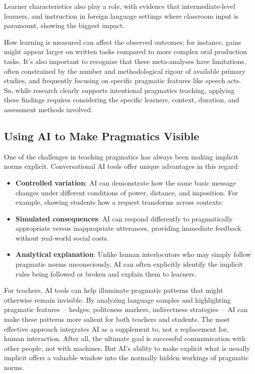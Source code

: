 Learner characteristics also play a role, with evidence that intermediate-level learners, and instruction in foreign language settings where classroom input is paramount, showing the biggest impact.

How learning is measured can affect the observed outcomes; for instance, gains might appear larger on written tasks compared to more complex oral production tasks. It's also important to recognize that these meta-analyses have limitations, often constrained by the number and methodological rigour of available primary studies, and frequently focusing on specific pragmatic features like speech acts. So, while research clearly supports intentional pragmatics teaching, applying these findings requires considering the specific learners, context, duration, and assessment methods involved.

\subsection{Using AI to Make Pragmatics Visible}
One of the challenges in teaching pragmatics has always been making implicit norms explicit. Conversational AI tools offer unique advantages in this regard:
\begin{itemize}[noitemsep]
\item \textbf{Controlled variation}: AI can demonstrate how the same basic message changes under different conditions of power, distance, and imposition. For example, showing students how a request transforms across contexts:
\ea
   \z
\z

\item \textbf{Simulated consequences}: AI can respond differently to pragmatically appropriate versus inappropriate utterances, providing immediate feedback without real-world social costs.

\item \textbf{Analytical explanation}: Unlike human interlocutors who may simply follow pragmatic norms unconsciously, AI can often explicitly identify the implicit rules being followed or broken and explain them to learners.

\end{itemize}
For teachers, AI tools can help illuminate pragmatic patterns that might otherwise remain invisible. By analyzing language samples and highlighting pragmatic features~-- hedges, politeness markers, indirectness strategies~-- AI can make these patterns more salient for both teachers and students.
The most effective approach integrates AI as a supplement to, not a replacement for, human interaction. After all, the ultimate goal is successful communication with other people, not with machines. But AI's ability to make explicit what is usually implicit offers a valuable window into the normally hidden workings of pragmatic norms.

